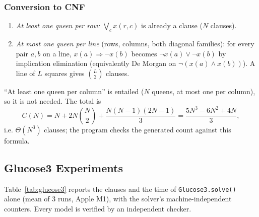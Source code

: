 \documentclass[conference]{IEEEtran}
\begin{document}
\subsubsection{Conversion to CNF}
\begin{enumerate}
    \item \textit{At least one queen per row:} $\bigvee_{c} x(r,c)$ is already a clause ($N$ clauses).
    \item \textit{At most one queen per line} (rows, columns, both diagonal families): for every pair $a,b$ on a line, $x(a)\Rightarrow\neg x(b)$ becomes $\neg x(a)\vee\neg x(b)$ by implication elimination (equivalently De Morgan on $\neg(x(a)\wedge x(b))$). A line of $L$ squares gives $\binom{L}{2}$ clauses.
\end{enumerate}
``At least one queen per column'' is entailed ($N$ queens, at most one per column), so it is not needed. The total is
\begin{equation}
    C(N)=N+2N\binom{N}{2}+\frac{N(N-1)(2N-1)}{3}=\frac{5N^3-6N^2+4N}{3},
\end{equation}
i.e. $\Theta(N^3)$ clauses; the program checks the generated count against this formula.

\subsection{Glucose3 Experiments}
Table~\ref{tab:glucose3} reports the clauses and the time of \texttt{Glucose3.solve()}~\cite{glucose,pysat} alone (mean of 3 runs, Apple M1), with the solver's machine-independent counters. Every model is verified by an independent checker.

\begin{table}[htbp]
\caption{Glucose3 on $N$-Queens for Increasing $N$}
\label{tab:glucose3}
\centering
{}
\end{table}
\end{document}
